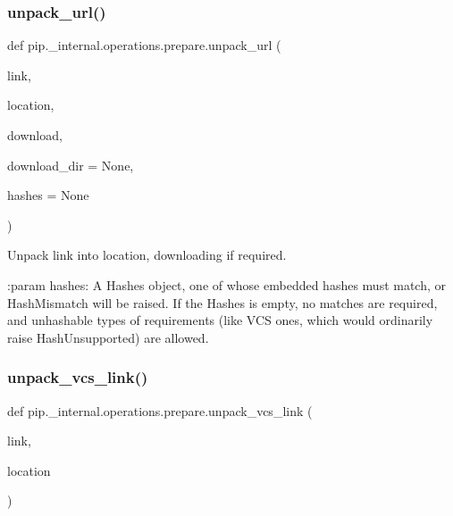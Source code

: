 \mbox{\label{namespacepip_1_1__internal_1_1operations_1_1prepare_a7d45b87bf33198f796af1e437cf4bebe}} 
\subsubsection{\texorpdfstring{unpack\+\_\+url()}{unpack\_url()}}
{\footnotesize\ttfamily def pip.\+\_\+internal.\+operations.\+prepare.\+unpack\+\_\+url (\begin{DoxyParamCaption}\item[{}]{link,  }\item[{}]{location,  }\item[{}]{download,  }\item[{}]{download\+\_\+dir = {\ttfamily None},  }\item[{}]{hashes = {\ttfamily None} }\end{DoxyParamCaption})}

\begin{DoxyVerb}Unpack link into location, downloading if required.

:param hashes: A Hashes object, one of whose embedded hashes must match,
    or HashMismatch will be raised. If the Hashes is empty, no matches are
    required, and unhashable types of requirements (like VCS ones, which
    would ordinarily raise HashUnsupported) are allowed.
\end{DoxyVerb}
 \mbox{\label{namespacepip_1_1__internal_1_1operations_1_1prepare_a51749831006429999baef3eb8b71c8a0}} 
\subsubsection{\texorpdfstring{unpack\+\_\+vcs\+\_\+link()}{unpack\_vcs\_link()}}
{\footnotesize\ttfamily def pip.\+\_\+internal.\+operations.\+prepare.\+unpack\+\_\+vcs\+\_\+link (\begin{DoxyParamCaption}\item[{}]{link,  }\item[{}]{location }\end{DoxyParamCaption})}



